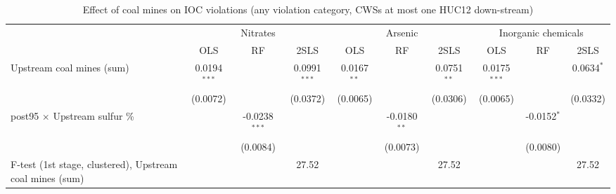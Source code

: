 
\begin{table}[htbp]
   
   \caption{\label{2sls_dwnstrm_minevio_allcat_ivsum_binvio} Effect of coal mines on IOC violations (any violation category, CWSs at most one HUC12 down-stream)}
   \bigskip
   
   \centering
   
   \begin{adjustbox}{width = \textwidth, center}
      
      
      \begin{tabular}{lccccccccc}
         \toprule
         
          & \multicolumn{3}{c}{Nitrates} & \multicolumn{3}{c}{Arsenic} & \multicolumn{3}{c}{Inorganic chemicals}\\
         
                                                                  & OLS            & RF              & 2SLS           & OLS           & RF             & 2SLS          & OLS            & RF            & 2SLS\\  
         
         \midrule 
         Upstream coal mines (sum)                                & 0.0194$^{***}$ &                 & 0.0991$^{***}$ & 0.0167$^{**}$ &                & 0.0751$^{**}$ & 0.0175$^{***}$ &               & 0.0634$^{*}$\\   
                                                                  & (0.0072)       &                 & (0.0372)       & (0.0065)      &                & (0.0306)      & (0.0065)       &               & (0.0332)\\   
         post95 $\times$ Upstream sulfur \%                       &                & -0.0238$^{***}$ &                &               & -0.0180$^{**}$ &               &                & -0.0152$^{*}$ &   \\   
                                                                  &                & (0.0084)        &                &               & (0.0073)       &               &                & (0.0080)      &   \\   
         
         F-test (1st stage, clustered), Upstream coal mines (sum) &                &                 & 27.52          &               &                & 27.52         &                &               & 27.52\\  
         

\end{tabular}
\end{adjustbox}
\end{table}
